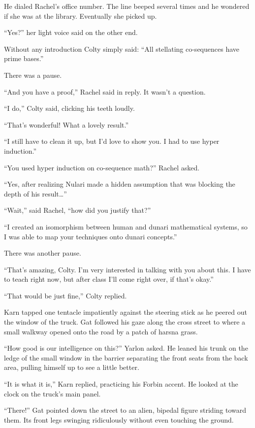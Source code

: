 He dialed Rachel's office number. The line beeped several times and he wondered if she was at
the library. Eventually she picked up.

``Yes?'' her light voice said on the other end.

Without any introduction Colty simply said: ``All stellating co-sequences have prime bases.''

There was a pause.

``And you have a proof,'' Rachel said in reply. It wasn't a question.

``I do,'' Colty said, clicking his teeth loudly.

``That's wonderful! What a lovely result.''

``I still have to clean it up, but I'd love to show you. I had to use hyper induction.''

``You used hyper induction on co-sequence math?'' Rachel asked.

``Yes, after realizing Nulari made a hidden assumption that was blocking the depth of his
result\ldots''

``Wait,'' said Rachel, ``how did you justify that?''

``I created an isomorphism between human and dunari mathematical systems, so I was able to map
your techniques onto dunari concepts.''

There was another pause.

``That's amazing, Colty. I'm very interested in talking with you about this. I have to teach
right now, but after class I'll come right over, if that's okay.''

``That would be just fine,'' Colty replied.

\spacebreak

Karn tapped one tentacle impatiently against the steering stick as he peered out the window of
the truck. Gat followed his gaze along the cross street to where a small walkway opened onto the
road by a patch of harsna grass.

``How good is our intelligence on this?'' Yarlon asked. He leaned his trunk on the ledge of the
small window in the barrier separating the front seats from the back area, pulling himself up to
see a little better.


``It is what it is,'' Karn replied, practicing his Forbin accent. He looked at the clock on the
truck's main panel.

``There!'' Gat pointed down the street to an alien, bipedal figure striding toward them. Its
front legs swinging ridiculously without even touching the ground.


